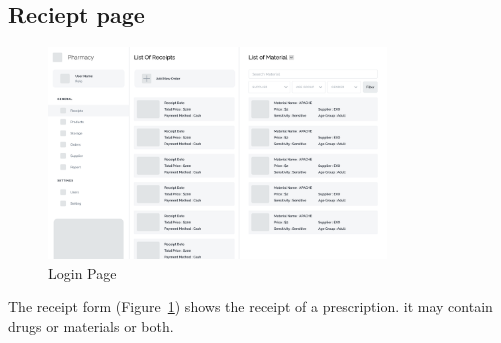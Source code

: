 \subsection{Reciept page}
\begin{figure}[h]
\centering
\includegraphics[width=0.8\textwidth]{sections/reciept_WF.png}
\caption{Login Page}
\label{fig:reciept}
\end{figure}
The receipt form (Figure~\ref{fig:reciept}) shows the receipt of a prescription. it may contain drugs or materials or both.